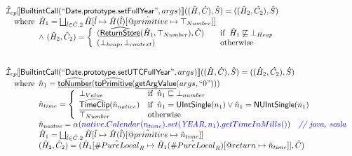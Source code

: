 \documentclass{article}
\makeatletter
\newcommand{\SF}[1]{\mbox{\textsf{#1}}}
\newcommand{\comment}[1]{\textit{#1}}
\newcommand{\wherec}[1]{{\rm where}\begin{array}[t]{l}#1\end{array}}
\newcommand{\ifc}[1]{{\rm if}\begin{array}[t]{l}#1\end{array}}
\newcommand{\owc}{{\rm otherwise}}
\newcommand{\aI}{\hat{\mathcal{I}}}
\newcommand{\lbr}{\llbracket}
\newcommand{\rbr}{\rrbracket}
\newcommand{\hf}[1]{\underline{\sf #1}}
\newcommand{\ahf}[1]{\widehat{\underline{\sf #1}}}
\newcommand{\varprop}[1]{@#1}
\newcommand{\avarloc}[1]{\hat{\##1}}
\newcommand{\avarprop}[1]{\hat{@#1}}
\def\inblue{\color{blue}}
\def\inblue{\color{blue}}
\makeatother
\begin{document}
\[
\begin{array}{l}

\aI _{cp}\lbr \SF{BuiltintCall}(``\SF{Date.prototype.setFullYear}",args_{})\rbr((\hat{H},\hat{C}), \hat{S})
  = ((\hat{H}_2, \hat{C_2}), \hat{S})\\
\quad\wherec{
  \hat{H}_1 = \bigsqcup_{\hat{l} \in \hat{C}.2} \hat{H}[\hat{l}
    \mapsto \hat{H}(\hat{l})[\avarprop{primitive} \mapsto \top_{Number}]]\\
  \land\ (\hat{H}_2, \hat{C}_2) = 
    \left\{\begin{array}{l@{\quad\quad}l}
      (\ahf{ReturnStore}(\hat{H}_1, \top_{Number}), \hat{C})
      & \ifc{\hat{H}_1 \not\sqsubseteq \bot_{Heap}}\\
      (\bot_{heap}, \bot_{context}) & \owc \\
    \end{array}\right.\\
  }\\
\\\\


\aI _{cp}\lbr \SF{BuiltintCall}(``\SF{Date.prototype.setUTCFullYear}",args_{})\rbr((\hat{H},\hat{C}), \hat{S})
  = ((\hat{H}_2, \hat{C_2}), \hat{S})\\
\quad\wherec{
  \hat{n}_{1} = \ahf{toNumber}(\ahf{toPrimitive}(\hf{getArgValue}(args, ``0")))\\
  \hat{n}_{time} = \left\{\begin{array}{ll}
      \bot_{Value} & \ifc{\hat{n}_{1} \sqsubseteq  \bot_{number}}\\
      \ahf{TimeClip}(\hat{n}_{native})
      & \ifc{\hat{n}_{1} = \SF{UIntSingle}(n_{1}) \lor \hat{n}_{1} = \SF{NUIntSingle}(n_{1}) }\\
      \top_{Number} & \owc
    \end{array}\right.\\
  \hat{n}_{naitve} = \alpha({\inblue native.Calendar(n_{time}).set(\emph{YEAR}, n_{1}).getTimeInMills()})
    \quad\comment{{\inblue // java, scala}}\\  
  \hat{H}_1 = \bigsqcup_{\hat{l} \in \hat{C}.2} \hat{H}[\hat{l}
    \mapsto \hat{H}(\hat{l})[\avarprop{primitive} \mapsto \hat{n}_{time}]]\\
  (\hat{H}_2, \hat{C}_2) = 
    (\hat{H}_1[\avarloc{PureLocal}_R \mapsto \hat{H}_1(\avarloc{PureLocal}_R)
      [\varprop{return} \mapsto \hat{n}_{time}]], \hat{C})\\
  }\\
\\\\


\end{array}\]
\end{document}
